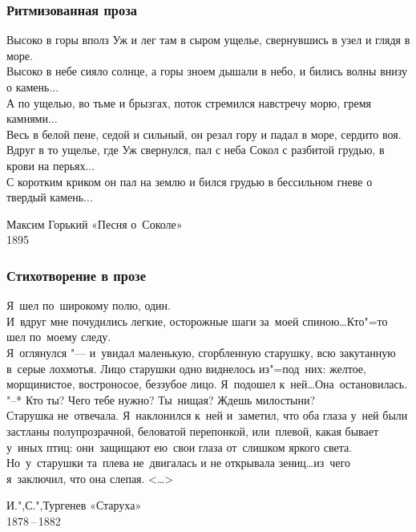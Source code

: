 \documentclass{beamer}
\begin{document}
%
\begin{frame}
\frametitle{Ритмизованная проза}

\begin{flushleft}
Высоко в горы вполз Уж и лег там в сыром ущелье, свернувшись в узел и глядя в море.\\
Высоко в небе сияло солнце, а горы зноем дышали в небо, и бились волны внизу о камень...\\
А по ущелью, во тьме и брызгах, поток стремился навстречу морю, гремя камнями...\\
Весь в белой пене, седой и сильный, он резал гору и падал в море, сердито воя.\\
Вдруг в то ущелье, где Уж свернулся, пал с неба Сокол с разбитой грудью, в крови на перьях...\\
С коротким криком он пал на землю и бился грудью в бессильном гневе о твердый камень...
\end{flushleft}

Максим Горький «Песня о~Соколе»\\
1895

\end{frame}
%
%
\begin{frame}
\frametitle{Стихотворение в прозе}

\begin{flushleft}
Я~шел по~широкому полю, один.\\
И~вдруг мне почудились легкие, осторожные шаги за~моей спиною\ldots Кто"=то шел по~моему следу.\\
Я~оглянулся "--- и~увидал маленькую, сгорбленную старушку, всю закутанную в~серые лохмотья. Лицо старушки одно виднелось из"=под~них: желтое, морщинистое, востроносое, беззубое лицо.
Я~подошел к~ней\ldots Она~остановилась.\\
"--* Кто ты? Чего тебе нужно? Ты~нищая? Ждешь милостыни?\\
Старушка не~отвечала. Я~наклонился к~ней и~заметил, что оба глаза у~ней были застланы полупрозрачной, беловатой перепонкой, или~плевой, какая бывает у~иных птиц: они~защищают ею~свои глаза от~слишком яркого света.\\
Но~у~старушки та~плева не~двигалась и не открывала зениц\ldots из~чего я~заключил, что она слепая. <\ldots>
\end{flushleft}

И.",С.",Тургенев «Старуха»\\
1878\,--\,1882

\end{frame}
\end{document}
